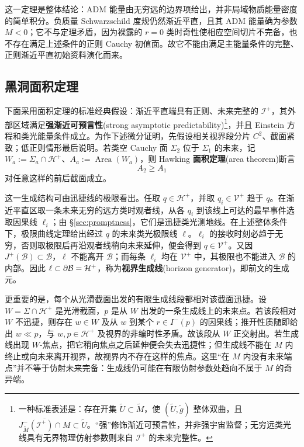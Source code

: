 这一定理是整体结论：ADM 能量由无穷远的边界项给出，并非局域物质能量密度的简单积分。负质量 Schwarzschild 度规仍然渐近平直，且其 ADM 能量确为参数 $M<0$；它不与定理矛盾，因为裸露的 $r=0$ 类时奇性使相应空间切片不完备，也不存在满足上述条件的正则 Cauchy 初值面。故它不能由满足主能量条件的完整、正则渐近平直初始资料演化而来。

\subsection{黑洞面积定理}

下面采用面积定理的标准经典假设：渐近平直端具有正则、未来完整的 $\mathscr I^+$，其外部区域满足\textbf{强渐近可预言性}(strong asymptotic predictability)\footnote{一种标准表述是：存在开集 $\widetilde U\subset\widetilde M$，使 $(\widetilde U,\widetilde g)$ 整体双曲，且 $\overline{J^-_{\widetilde M}(\mathscr I^+)\cap M}\subset\widetilde U$。“强”修饰渐近可预言性，并非强宇宙监督；无穷远类光线具有无界物理仿射参数则来自 $\mathscr I^+$ 的未来完整性。}，并且 Einstein 方程和类光能量条件成立。为作下述微分证明，先假设相关视界段分片 $C^2$、截面紧致；低正则情形最后说明。若类空 Cauchy 面 $\Sigma_2$ 位于 $\Sigma_1$ 的未来，记 $W_a:=\Sigma_a\cap\mathcal H^+$、$A_a:=\operatorname{Area}(W_a)$，则 Hawking \textbf{面积定理}(area theorem)断言
\begin{equation}\label{eq:hawking-area-theorem}
    A_2\geqslant A_1
\end{equation}
对任意这样的前后截面成立。

这一生成结构可由迅捷线的极限看出。任取 $q\in\mathcal H^+$，并取 $q_i\in\mathcal V^+$ 趋于 $q$。在渐近平直区取一条未来无穷的远方类时观者线，从各 $q_i$ 到该线上可达的最早事件选取因果线 $\ell_i$；由 \S\ref{sec:promptness}，它们是迅捷类光测地线。在上述整体条件下，极限曲线定理给出经过 $q$ 的未来类光极限线 $\ell$。$\ell_i$ 的接收时刻必趋于无穷，否则取极限后再沿观者线稍向未来延伸，便会得到 $q\in\mathcal V^+$。又因 $J^+(\mathcal B)\subset\mathcal B$，$\ell$ 不能离开 $\mathcal B$；而每条 $\ell_i$ 均在 $\mathcal V^+$ 中，其极限也不能进入 $\mathcal B$ 的内部。因此 $\ell\subset\partial\mathcal B=\mathcal H^+$，称为\textbf{视界生成线}(horizon generator)，即前文的生成元。

更重要的是，每个从光滑截面出发的有限生成线段都相对该截面迅捷。设 $W=\Sigma\cap\mathcal H^+$ 是光滑截面，$p$ 是从 $W$ 出发的一条生成线上的未来点。若该段相对 $W$ 不迅捷，则存在 $w\in W$ 及从 $w$ 到某个 $r\in I^-(p)$ 的因果线；推开性质随即给出 $w\ll p$，与 $w,p\in\mathcal H^+$ 及视界的非编时性矛盾。故该段从 $W$ 正交射出。若生成线出现 $W$-焦点，把它稍向焦点之后延伸便会失去迅捷性；但生成线不能在 $M$ 内终止或向未来离开视界，故视界内不存在这样的焦点。这里“在 $M$ 内没有未来端点”并不等于仿射未来完备：生成线仍可能在有限仿射参数处趋向不属于 $M$ 的奇异端。

